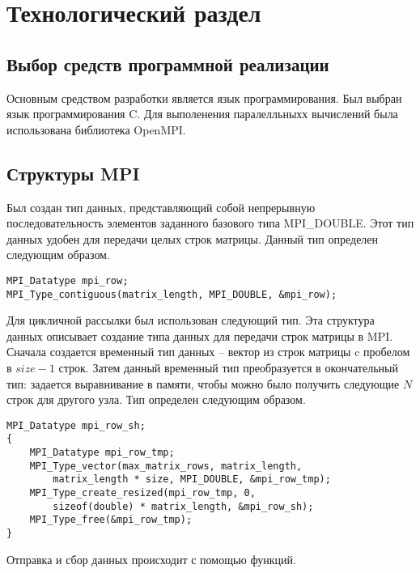 \chapter{Технологический раздел}
\label{cha:impl}


\section{Выбор средств программной реализации}


Основным средством разработки является язык программирования.
Был выбран язык программирования C.
Для выполенения паралелльныхх вычислений была использована библиотека OpenMPI.


\section{Структуры MPI}


Был создан тип данных, представляющий собой непрерывную последовательность элементов заданного базового типа MPI\_DOUBLE.
Этот тип данных удобен для передачи целых строк матрицы.
Данный тип определен следующим образом.

\begin{small}
    \begin{verbatim}
MPI_Datatype mpi_row;
MPI_Type_contiguous(matrix_length, MPI_DOUBLE, &mpi_row);
    \end{verbatim}
\end{small}

Для цикличной рассылки был использован следующий тип.
Эта структура данных описывает создание типа данных для передачи строк матрицы в MPI.
Сначала создается временный тип данных -- вектор из строк матрицы c пробелом в $size-1$ строк.
Затем данный временный тип преобразуется в окончательный тип: задается выравнивание в памяти, чтобы можно было получить следующие $N$ строк для другого узла.
Тип определен следующим образом.


\begin{small}
    \begin{verbatim}
MPI_Datatype mpi_row_sh;
{
    MPI_Datatype mpi_row_tmp;
    MPI_Type_vector(max_matrix_rows, matrix_length,
        matrix_length * size, MPI_DOUBLE, &mpi_row_tmp);
    MPI_Type_create_resized(mpi_row_tmp, 0,
        sizeof(double) * matrix_length, &mpi_row_sh);
    MPI_Type_free(&mpi_row_tmp);
}
    \end{verbatim}
\end{small}


Отправка и сбор данных происходит с помощью функций.


